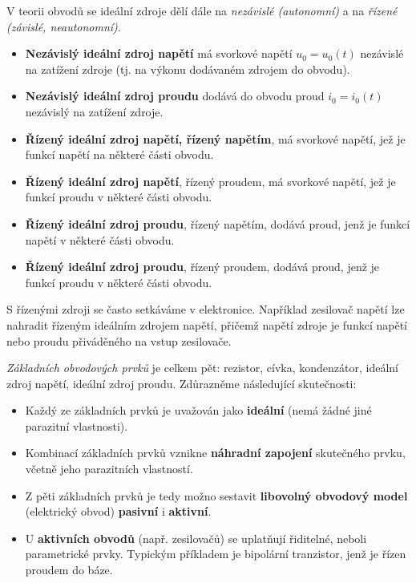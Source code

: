         V teorii obvodů se ideální zdroje dělí dále na \emph{nezávislé (autonomní)} a na 
        \emph{řízené (závislé, neautonomní)}.
        \begin{itemize}
          \item \textbf{Nezávislý ideální zdroj napětí} má svorkové napětí \(u_0 = u_0(t)\) 
                nezávislé na zatížení zdroje (tj. na výkonu dodávaném zdrojem do obvodu).
          \item \textbf{Nezávislý ideální zdroj proudu} dodává do obvodu proud \(i_0 = i_0(t)\) 
                nezávislý na zatížení zdroje.
          \item \textbf{Řízený ideální zdroj napětí, řízený napětím}, má svorkové napětí, jež je 
                funkcí napětí na některé části obvodu.
          \item \textbf{Řízený ideální zdroj napětí}, řízený proudem, má svorkové napětí, jež je 
                funkcí proudu v některé části obvodu.
          \item \textbf{Řízený ideální zdroj proudu}, řízený napětím, dodává proud, jenž je funkcí 
                napětí v některé části obvodu.
          \item \textbf{Řízený ideální zdroj proudu}, řízený proudem, dodává proud, jenž je funkcí 
                proudu v některé části obvodu.
        \end{itemize}
        
        S řízenými zdroji se často setkáváme v elektronice. Například zesilovač napětí lze nahradit 
        řízeným ideálním zdrojem napětí, přičemž napětí zdroje je funkcí napětí nebo proudu 
        přiváděného na vstup zesilovače.

        \emph{Základních obvodových prvků} je celkem pět: rezistor, cívka, kondenzátor, ideální 
        zdroj napětí, ideální zdroj proudu. Zdůrazněme následující skutečnosti:
        \begin{itemize}
          \itemsep0em 
          \item Každý ze základních prvků je uvažován jako \textbf{ideální} (nemá žádné jiné  
                parazitní vlastnosti).
          \item Kombinací základních prvků vznikne \textbf{náhradní zapojení} skutečného prvku, 
                včetně jeho parazitních vlastností.
          \item Z pěti základních prvků je tedy možno sestavit \textbf{libovolný obvodový model}
                (elektrický obvod) \textbf{pasivní} i \textbf{aktivní}.
          \item U \textbf{aktivních obvodů} (např. zesilovačů) se uplatňují řiditelné, neboli
                parametrické prvky. Typickým příkladem je bipolární tranzistor, jenž je řízen 
                proudem do báze.
        \end{itemize}
      
